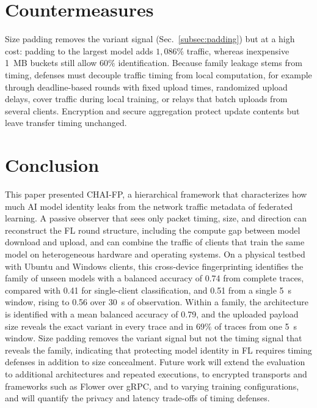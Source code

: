 \documentclass[conference]{IEEEtran}
\begin{document}
\section{Countermeasures}
\label{sec:discussion}
Size padding removes the variant signal (Sec.~\ref{subsec:padding}) but at a
high cost: padding to the largest model adds $1{,}086\%$ traffic, whereas
inexpensive 1~MB buckets still allow $60\%$ identification. Because family
leakage stems from timing, defenses must decouple traffic timing from local
computation, for example through deadline-based rounds with fixed upload times,
randomized upload delays, cover traffic during local training, or relays that
batch uploads from several clients. Encryption and secure
aggregation protect update contents but leave
transfer timing unchanged.

\section{Conclusion}
\label{sec:conclusion}
This paper presented CHAI-FP, a hierarchical framework that characterizes how
much AI model identity leaks from the network traffic metadata of federated
learning. A passive observer that sees only packet timing, size, and direction
can reconstruct the FL round structure, including the compute gap between model
download and upload, and can combine the traffic of clients that train the same
model on heterogeneous hardware and operating systems. On a physical testbed
with Ubuntu and Windows clients, this cross-device fingerprinting identifies the
family of unseen models with a balanced accuracy of 0.74 from complete traces,
compared with 0.41 for single-client classification, and 0.51 from a single 5~s
window, rising to 0.56 over 30~s of observation. Within a family, the
architecture is identified with a mean balanced accuracy of 0.79, and the
uploaded payload size reveals the exact variant in every trace and in $69\%$ of
traces from one 5~s window. Size padding removes the variant signal but not the
timing signal that reveals the family, indicating that protecting model identity
in FL requires timing defenses in addition to size concealment. Future work will
extend the evaluation to additional architectures and repeated executions, to
encrypted transports and frameworks such as Flower over gRPC, and to varying
training configurations, and will quantify the privacy and latency trade-offs
of timing defenses.



\end{document}
